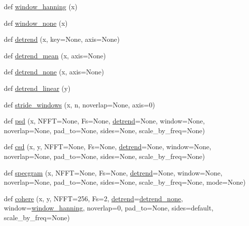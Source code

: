 \begin{DoxyCompactItemize}
\item 
def \hyperlink{namespacematplotlib_1_1mlab_a0be4c7ab27102a4d8ceb0a08a32ac0fc}{window\+\_\+hanning} (x)
\item 
def \hyperlink{namespacematplotlib_1_1mlab_acef28ebe480ae1d60bd6b695441873a0}{window\+\_\+none} (x)
\item 
def \hyperlink{namespacematplotlib_1_1mlab_a6139bfa85c059f2a11858aaab4471a5d}{detrend} (x, key=None, axis=None)
\item 
def \hyperlink{namespacematplotlib_1_1mlab_a33582c8e986a5abbf517793a90af9ec9}{detrend\+\_\+mean} (x, axis=None)
\item 
def \hyperlink{namespacematplotlib_1_1mlab_a359979aa8e0e635738648ca88ebd5e1d}{detrend\+\_\+none} (x, axis=None)
\item 
def \hyperlink{namespacematplotlib_1_1mlab_ad8259a7aec39bab4216763acc518aba2}{detrend\+\_\+linear} (y)
\item 
def \hyperlink{namespacematplotlib_1_1mlab_a80bb47f94fc42f477178fb4e77272c80}{stride\+\_\+windows} (x, n, noverlap=None, axis=0)
\item 
def \hyperlink{namespacematplotlib_1_1mlab_ac7e214a07b5569a236ed4a255e7d703d}{psd} (x, N\+F\+FT=None, Fs=None, \hyperlink{namespacematplotlib_1_1mlab_a6139bfa85c059f2a11858aaab4471a5d}{detrend}=None, window=None, noverlap=None, pad\+\_\+to=None, sides=None, scale\+\_\+by\+\_\+freq=None)
\item 
def \hyperlink{namespacematplotlib_1_1mlab_af5c09befd987c2d0090be90434de805a}{csd} (x, y, N\+F\+FT=None, Fs=None, \hyperlink{namespacematplotlib_1_1mlab_a6139bfa85c059f2a11858aaab4471a5d}{detrend}=None, window=None, noverlap=None, pad\+\_\+to=None, sides=None, scale\+\_\+by\+\_\+freq=None)
\item 
def \hyperlink{namespacematplotlib_1_1mlab_a1512ebd8694c242d0aa5d75518d74723}{specgram} (x, N\+F\+FT=None, Fs=None, \hyperlink{namespacematplotlib_1_1mlab_a6139bfa85c059f2a11858aaab4471a5d}{detrend}=None, window=None, noverlap=None, pad\+\_\+to=None, sides=None, scale\+\_\+by\+\_\+freq=None, mode=None)
\item 
def \hyperlink{namespacematplotlib_1_1mlab_a95254cce5b7e87a908f947cf3ee3a3c3}{cohere} (x, y, N\+F\+FT=256, Fs=2, \hyperlink{namespacematplotlib_1_1mlab_a6139bfa85c059f2a11858aaab4471a5d}{detrend}=\hyperlink{namespacematplotlib_1_1mlab_a359979aa8e0e635738648ca88ebd5e1d}{detrend\+\_\+none}, window=\hyperlink{namespacematplotlib_1_1mlab_a0be4c7ab27102a4d8ceb0a08a32ac0fc}{window\+\_\+hanning}, noverlap=0, pad\+\_\+to=None, sides=\textquotesingle{}default\textquotesingle{}, scale\+\_\+by\+\_\+freq=None)
\end{DoxyCompactItemize}
